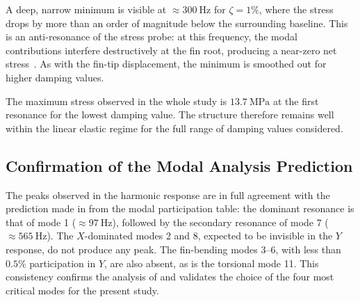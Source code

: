 A deep, narrow minimum is visible at $\approx \SI{300}{\hertz}$ for $\zeta = 1\%$, where the stress drops by more than an order of magnitude below the surrounding baseline. This is an anti-resonance of the stress probe: at this frequency, the modal contributions interfere destructively at the fin root, producing a near-zero net stress~\cite{inman_engineering_vibration}. As with the fin-tip displacement, the minimum is smoothed out for higher damping values.

The maximum stress observed in the whole study is $\SI{13.7}{\mega\pascal}$ at the first resonance for the lowest damping value. The structure therefore remains well within the linear elastic regime for the full range of damping values considered.

\subsection{Confirmation of the Modal Analysis Prediction}

The peaks observed in the harmonic response are in full agreement with the prediction made in  from the modal participation table: the dominant resonance is that of mode 1 ($\approx \SI{97}{\hertz}$), followed by the secondary resonance of mode 7 ($\approx \SI{565}{\hertz}$). The $X$-dominated modes 2 and 8, expected to be invisible in the $Y$ response, do not produce any peak. The fin-bending modes 3--6, with less than $0.5\%$ participation in $Y$, are also absent, as is the torsional mode 11. This consistency confirms the analysis of  and validates the choice of the four most critical modes for the present study.
